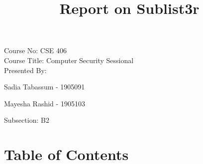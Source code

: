 \documentclass[12pt]{article}
\title{Report on Sublist3r}
\author{}
\date{}
\begin{document}
\maketitle
    Course No: CSE 406\\

    Course Title: Computer Security Sessional\\
    
    Presented By:

    Sadia Tabassum - 1905091

    Mayesha Rashid - 1905103

    Subsection: B2
\newpage

\section*{Table of Contents}
\end{document}
